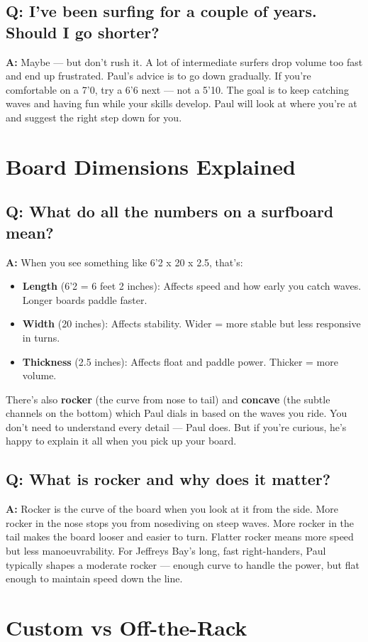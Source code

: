 \documentclass[11pt,a4paper]{article}
\newcommand{\question}[1]{\subsection*{Q: #1}}
\newcommand{\answer}{\noindent\textbf{A:} }
\begin{document}
\question{I've been surfing for a couple of years. Should I go shorter?}
\answer Maybe --- but don't rush it. A lot of intermediate surfers drop volume too fast and end up frustrated. Paul's advice is to go down gradually. If you're comfortable on a 7'0, try a 6'6 next --- not a 5'10. The goal is to keep catching waves and having fun while your skills develop. Paul will look at where you're at and suggest the right step down for you.

\section{Board Dimensions Explained}

\question{What do all the numbers on a surfboard mean?}
\answer When you see something like 6'2 x 20 x 2.5, that's:
\begin{itemize}[leftmargin=1.5em]
    \item \textbf{Length} (6'2 = 6 feet 2 inches): Affects speed and how early you catch waves. Longer boards paddle faster.
    \item \textbf{Width} (20 inches): Affects stability. Wider = more stable but less responsive in turns.
    \item \textbf{Thickness} (2.5 inches): Affects float and paddle power. Thicker = more volume.
\end{itemize}
There's also \textbf{rocker} (the curve from nose to tail) and \textbf{concave} (the subtle channels on the bottom) which Paul dials in based on the waves you ride. You don't need to understand every detail --- Paul does. But if you're curious, he's happy to explain it all when you pick up your board.

\question{What is rocker and why does it matter?}
\answer Rocker is the curve of the board when you look at it from the side. More rocker in the nose stops you from nosediving on steep waves. More rocker in the tail makes the board looser and easier to turn. Flatter rocker means more speed but less manoeuvrability. For Jeffreys Bay's long, fast right-handers, Paul typically shapes a moderate rocker --- enough curve to handle the power, but flat enough to maintain speed down the line.

\section{Custom vs Off-the-Rack}
\end{document}
